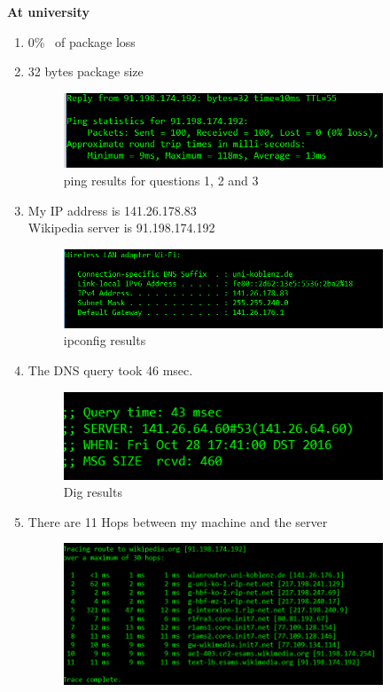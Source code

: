 \documentclass{WeSTassignment}
\begin{document}
\textbf{At university}
\begin{enumerate}
\itemsep0em
\item  0\% \ of package loss\
\item 32 bytes package size
\begin{figure}[h]
  \centering
  \includegraphics[width=0.9\textwidth]{ping.png}
   \caption{ping results for questions 1, 2 and 3}
     \label{fig:ping}
\end{figure}
\item My IP address is 141.26.178.83 \\ Wikipedia server is 91.198.174.192 \
\begin{figure}[!ht]
  \centering
  \includegraphics[width=0.9\textwidth]{my_ip.png}
   \caption{ipconfig results}
     \label{fig:ipconfig}
\end{figure}
\item The DNS query took 46 msec.
\begin{figure}[h]
  \centering
  \includegraphics[width=0.9\textwidth]{dig.png}
   \caption{Dig results}
     \label{fig:dig}
\end{figure}
\item There are 11 Hops between my machine and the server
\begin{figure}[h]
  \centering
  \includegraphics[width=0.9\textwidth]{tracert.png}

\end{figure}
\end{enumerate}
\end{document}
